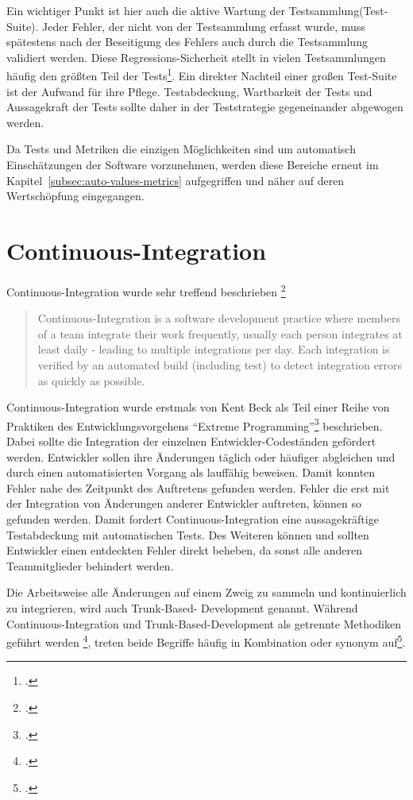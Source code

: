 Ein wichtiger Punkt ist hier auch die aktive Wartung der Testsammlung(Test-Suite). Jeder Fehler, der nicht von der Testsammlung 
erfasst wurde, muss spätestens nach der Beseitigung des Fehlers auch durch die Testsammlung validiert werden. Diese 
Regressions-Sicherheit stellt in vielen Testsammlungen häufig den größten Teil der Tests\footcite{software-quality2008}. Ein direkter Nachteil einer großen Test-Suite ist der Aufwand für ihre Pflege. Testabdeckung, Wartbarkeit der Tests und Aussagekraft der Tests sollte daher in der Teststrategie gegeneinander abgewogen werden.

Da Tests und Metriken die einzigen Möglichkeiten sind um automatisch Einschätzungen der Software vorzunehmen, werden 
diese Bereiche erneut im Kapitel~\ref{subsec:auto-values-metrics} aufgegriffen und näher auf deren Wertschöpfung 
eingegangen.

\section{Continuous-Integration}

Continuous-Integration wurde sehr treffend beschrieben \footcite{fowler2006}

\blockquote {Continuous-Integration is a software development practice where members of a team integrate their work 
frequently, usually each person integrates at least daily - leading to multiple integrations per day. Each integration is 
verified by an automated build (including test) to detect integration errors as quickly as possible.}

Continuous-Integration wurde erstmals von Kent Beck als Teil einer Reihe von Praktiken des Entwicklungsvorgehens ``Extreme Programming''\footcite{kent1999} beschrieben. Dabei sollte die Integration der einzelnen Entwickler-Codeständen gefördert werden. Entwickler sollen ihre Änderungen täglich oder häufiger abgleichen und durch einen automatisierten Vorgang als lauffähig beweisen. Damit konnten Fehler nahe des Zeitpunkt des Auftretens gefunden werden. Fehler die erst mit der Integration von Änderungen anderer Entwickler auftreten, können so gefunden werden. Damit fordert Continuous-Integration eine aussagekräftige Testabdeckung mit automatischen Tests. Des Weiteren können und sollten Entwickler einen entdeckten Fehler direkt beheben, da sonst alle anderen Teammitglieder behindert werden.

Die Arbeitsweise alle Änderungen auf einem Zweig zu sammeln und kontinuierlich zu integrieren, wird auch Trunk-Based-
Development genannt. Während Continuous-Integration und Trunk-Based-Development als getrennte Methodiken geführt werden
\footcite{trunkbaseddevelopment}, treten beide Begriffe häufig in Kombination oder synonym 
auf\footcite{fowler-feature-branch}.

